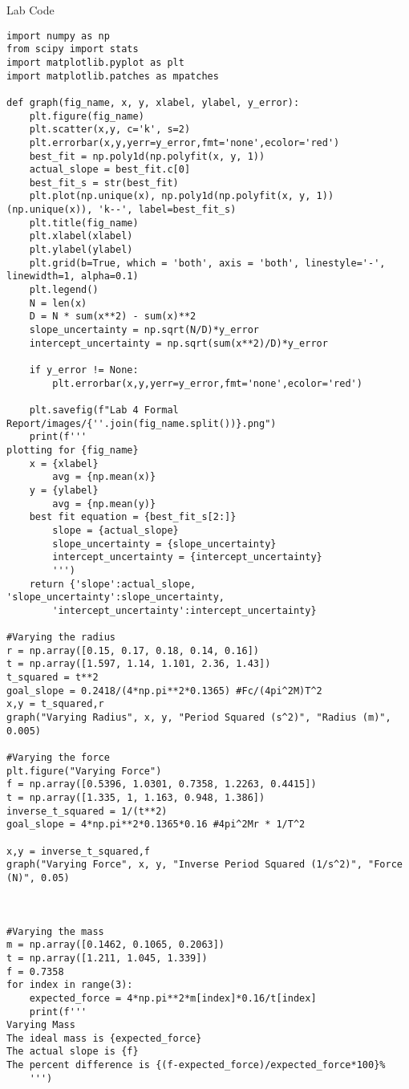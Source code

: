 Lab Code \\
\begin{lstlisting}
import numpy as np
from scipy import stats
import matplotlib.pyplot as plt
import matplotlib.patches as mpatches

def graph(fig_name, x, y, xlabel, ylabel, y_error):
    plt.figure(fig_name)
    plt.scatter(x,y, c='k', s=2)
    plt.errorbar(x,y,yerr=y_error,fmt='none',ecolor='red')
    best_fit = np.poly1d(np.polyfit(x, y, 1))
    actual_slope = best_fit.c[0]
    best_fit_s = str(best_fit)
    plt.plot(np.unique(x), np.poly1d(np.polyfit(x, y, 1))(np.unique(x)), 'k--', label=best_fit_s)
    plt.title(fig_name)
    plt.xlabel(xlabel)
    plt.ylabel(ylabel)
    plt.grid(b=True, which = 'both', axis = 'both', linestyle='-', linewidth=1, alpha=0.1)
    plt.legend()
    N = len(x)
    D = N * sum(x**2) - sum(x)**2
    slope_uncertainty = np.sqrt(N/D)*y_error
    intercept_uncertainty = np.sqrt(sum(x**2)/D)*y_error

    if y_error != None:
        plt.errorbar(x,y,yerr=y_error,fmt='none',ecolor='red')

    plt.savefig(f"Lab 4 Formal Report/images/{''.join(fig_name.split())}.png")
    print(f'''
plotting for {fig_name}
    x = {xlabel}
        avg = {np.mean(x)}
    y = {ylabel}
        avg = {np.mean(y)}
    best fit equation = {best_fit_s[2:]}
        slope = {actual_slope}
        slope_uncertainty = {slope_uncertainty}
        intercept_uncertainty = {intercept_uncertainty}
        ''')
    return {'slope':actual_slope, 'slope_uncertainty':slope_uncertainty,
        'intercept_uncertainty':intercept_uncertainty}

#Varying the radius
r = np.array([0.15, 0.17, 0.18, 0.14, 0.16])
t = np.array([1.597, 1.14, 1.101, 2.36, 1.43])
t_squared = t**2
goal_slope = 0.2418/(4*np.pi**2*0.1365) #Fc/(4pi^2M)T^2
x,y = t_squared,r
graph("Varying Radius", x, y, "Period Squared (s^2)", "Radius (m)", 0.005)

#Varying the force
plt.figure("Varying Force")
f = np.array([0.5396, 1.0301, 0.7358, 1.2263, 0.4415])
t = np.array([1.335, 1, 1.163, 0.948, 1.386])
inverse_t_squared = 1/(t**2)
goal_slope = 4*np.pi**2*0.1365*0.16 #4pi^2Mr * 1/T^2

x,y = inverse_t_squared,f
graph("Varying Force", x, y, "Inverse Period Squared (1/s^2)", "Force (N)", 0.05)



#Varying the mass
m = np.array([0.1462, 0.1065, 0.2063])
t = np.array([1.211, 1.045, 1.339])
f = 0.7358
for index in range(3):
    expected_force = 4*np.pi**2*m[index]*0.16/t[index]
    print(f'''
Varying Mass
The ideal mass is {expected_force}
The actual slope is {f}
The percent difference is {(f-expected_force)/expected_force*100}%
    ''')
\end{lstlisting}
